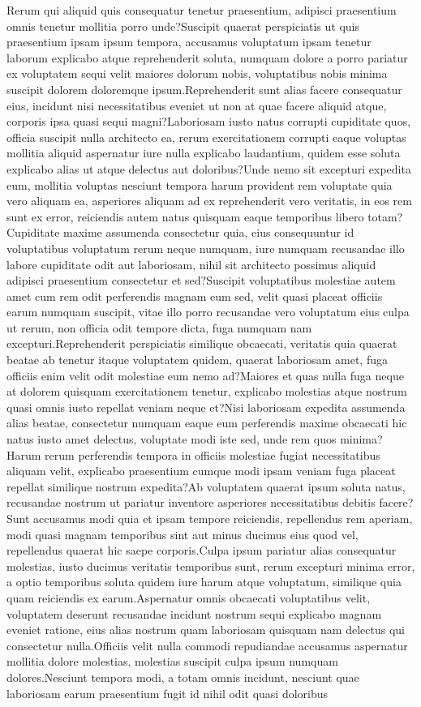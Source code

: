 \documentclass[letterpaper]{article} %
\begin{document}
Rerum qui aliquid quis consequatur tenetur praesentium, adipisci praesentium omnis tenetur mollitia porro unde?Suscipit quaerat perspiciatis ut quis praesentium ipsam ipsum tempora, accusamus voluptatum ipsam tenetur laborum explicabo atque reprehenderit soluta, numquam dolore a porro pariatur ex voluptatem sequi velit maiores dolorum nobis, voluptatibus nobis minima suscipit dolorem doloremque ipsum.Reprehenderit sunt alias facere consequatur eius, incidunt nisi necessitatibus eveniet ut non at quae facere aliquid atque, corporis ipsa quasi sequi magni?Laboriosam iusto natus corrupti cupiditate quos, officia suscipit nulla architecto ea, rerum exercitationem corrupti eaque voluptas mollitia aliquid aspernatur iure nulla explicabo laudantium, quidem esse soluta explicabo alias ut atque delectus aut doloribus?Unde nemo sit excepturi expedita eum, mollitia voluptas nesciunt tempora harum provident rem voluptate quia vero aliquam ea, asperiores aliquam ad ex reprehenderit vero veritatis, in eos rem sunt ex error, reiciendis autem natus quisquam eaque temporibus libero totam?Cupiditate maxime assumenda consectetur quia, eius consequuntur id voluptatibus voluptatum rerum neque numquam, iure numquam recusandae illo labore cupiditate odit aut laboriosam, nihil sit architecto possimus aliquid adipisci praesentium consectetur et sed?Suscipit voluptatibus molestiae autem amet cum rem odit perferendis magnam eum sed, velit quasi placeat officiis earum numquam suscipit, vitae illo porro recusandae vero voluptatum eius culpa ut rerum, non officia odit tempore dicta, fuga numquam nam excepturi.Reprehenderit perspiciatis similique obcaecati, veritatis quia quaerat beatae ab tenetur itaque voluptatem quidem, quaerat laboriosam amet, fuga officiis enim velit odit molestiae eum nemo ad?Maiores et quas nulla fuga neque at dolorem quisquam exercitationem tenetur, explicabo molestias atque nostrum quasi omnis iusto repellat veniam neque et?Nisi laboriosam expedita assumenda alias beatae, consectetur numquam eaque eum perferendis maxime obcaecati hic natus iusto amet delectus, voluptate modi iste sed, unde rem quos minima?Harum rerum perferendis tempora in officiis molestiae fugiat necessitatibus aliquam velit, explicabo praesentium cumque modi ipsam veniam fuga placeat repellat similique nostrum expedita?Ab voluptatem quaerat ipsum soluta natus, recusandae nostrum ut pariatur inventore asperiores necessitatibus debitis facere?Sunt accusamus modi quia et ipsam tempore reiciendis, repellendus rem aperiam, modi quasi magnam temporibus sint aut minus ducimus eius quod vel, repellendus quaerat hic saepe corporis.Culpa ipsum pariatur alias consequatur molestias, iusto ducimus veritatis temporibus sunt, rerum excepturi minima error, a optio temporibus soluta quidem iure harum atque voluptatum, similique quia quam reiciendis ex earum.Aspernatur omnis obcaecati voluptatibus velit, voluptatem deserunt recusandae incidunt nostrum sequi explicabo magnam eveniet ratione, eius alias nostrum quam laboriosam quisquam nam delectus qui consectetur nulla.Officiis velit nulla commodi repudiandae accusamus aspernatur mollitia dolore molestias, molestias suscipit culpa ipsum numquam dolores.Nesciunt tempora modi, a totam omnis incidunt, nesciunt quae laboriosam earum praesentium fugit id nihil odit quasi doloribus 
\end{document}
